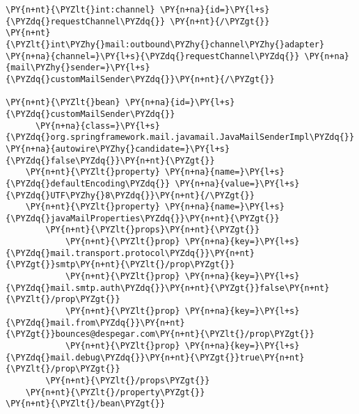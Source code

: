 \begin{Verbatim}[commandchars=\\\{\}]
\PY{n+nt}{\PYZlt{}int:channel} \PY{n+na}{id=}\PY{l+s}{\PYZdq{}requestChannel\PYZdq{}} \PY{n+nt}{/\PYZgt{}}
\PY{n+nt}{\PYZlt{}int\PYZhy{}mail:outbound\PYZhy{}channel\PYZhy{}adapter} \PY{n+na}{channel=}\PY{l+s}{\PYZdq{}requestChannel\PYZdq{}} \PY{n+na}{mail\PYZhy{}sender=}\PY{l+s}{\PYZdq{}customMailSender\PYZdq{}}\PY{n+nt}{/\PYZgt{}}

\PY{n+nt}{\PYZlt{}bean} \PY{n+na}{id=}\PY{l+s}{\PYZdq{}customMailSender\PYZdq{}} 
      \PY{n+na}{class=}\PY{l+s}{\PYZdq{}org.springframework.mail.javamail.JavaMailSenderImpl\PYZdq{}} \PY{n+na}{autowire\PYZhy{}candidate=}\PY{l+s}{\PYZdq{}false\PYZdq{}}\PY{n+nt}{\PYZgt{}}
    \PY{n+nt}{\PYZlt{}property} \PY{n+na}{name=}\PY{l+s}{\PYZdq{}defaultEncoding\PYZdq{}} \PY{n+na}{value=}\PY{l+s}{\PYZdq{}UTF\PYZhy{}8\PYZdq{}}\PY{n+nt}{/\PYZgt{}}
    \PY{n+nt}{\PYZlt{}property} \PY{n+na}{name=}\PY{l+s}{\PYZdq{}javaMailProperties\PYZdq{}}\PY{n+nt}{\PYZgt{}}
        \PY{n+nt}{\PYZlt{}props}\PY{n+nt}{\PYZgt{}}
            \PY{n+nt}{\PYZlt{}prop} \PY{n+na}{key=}\PY{l+s}{\PYZdq{}mail.transport.protocol\PYZdq{}}\PY{n+nt}{\PYZgt{}}smtp\PY{n+nt}{\PYZlt{}/prop\PYZgt{}}
            \PY{n+nt}{\PYZlt{}prop} \PY{n+na}{key=}\PY{l+s}{\PYZdq{}mail.smtp.auth\PYZdq{}}\PY{n+nt}{\PYZgt{}}false\PY{n+nt}{\PYZlt{}/prop\PYZgt{}}
            \PY{n+nt}{\PYZlt{}prop} \PY{n+na}{key=}\PY{l+s}{\PYZdq{}mail.from\PYZdq{}}\PY{n+nt}{\PYZgt{}}bounces@despegar.com\PY{n+nt}{\PYZlt{}/prop\PYZgt{}}
            \PY{n+nt}{\PYZlt{}prop} \PY{n+na}{key=}\PY{l+s}{\PYZdq{}mail.debug\PYZdq{}}\PY{n+nt}{\PYZgt{}}true\PY{n+nt}{\PYZlt{}/prop\PYZgt{}}
        \PY{n+nt}{\PYZlt{}/props\PYZgt{}}
    \PY{n+nt}{\PYZlt{}/property\PYZgt{}}
\PY{n+nt}{\PYZlt{}/bean\PYZgt{}}
\end{Verbatim}
